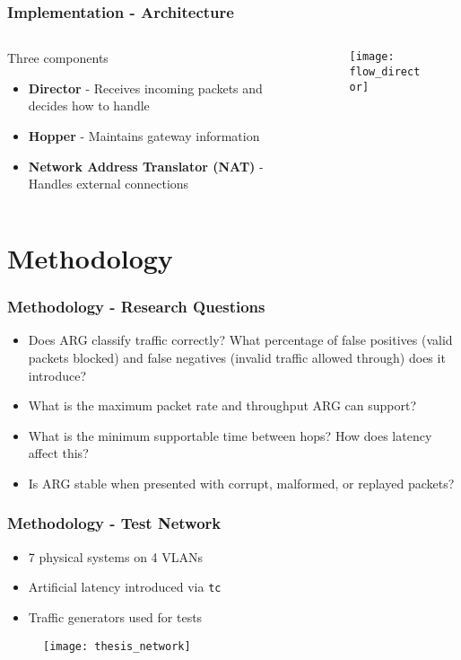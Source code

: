 \documentclass{beamer}
\begin{document}
\begin{frame}
	\frametitle{Implementation - Architecture}

	\begin{columns}
	\begin{column}{.45\textwidth}
		Three components
		\begin{itemize}
		\item \textbf{Director} - Receives incoming packets and decides how to handle
		\item \textbf{Hopper} - Maintains gateway information
		\item \textbf{Network Address Translator (NAT)} - Handles external connections
		\end{itemize}
	\end{column}
	\begin{column}{.55\textwidth}
		\begin{figure}
		\texttt{[image: flow\_director]}
		\end{figure}
	\end{column}
	\end{columns}
\end{frame}

\section{Methodology}
\begin{frame}
	\frametitle{Methodology - Research Questions}

	\begin{itemize}
	\item Does ARG classify traffic correctly? What percentage of false positives (valid packets blocked) and false negatives (invalid traffic allowed through) does it introduce?
	\item What is the maximum packet rate and throughput ARG can support?
	\item What is the minimum supportable time between hops? How does latency affect this?
	\item Is ARG stable when presented with corrupt, malformed, or replayed packets?
	\end{itemize}
\end{frame}

\begin{frame}
	\frametitle{Methodology - Test Network}

	\begin{itemize}
	\item 7 physical systems on 4 VLANs
	\item Artificial latency introduced via \texttt{tc}
	\item Traffic generators used for tests
	\end{itemize}
	
	\vspace{-15pt}
	\begin{figure}
	\texttt{[image: thesis\_network]}
	\end{figure}
\end{frame}
\end{document}
